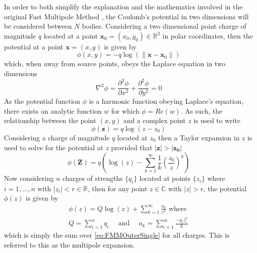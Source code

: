 In order to both simplify the explanation and the mathematics involved in the original Fast Multipole Method \cite{Greengard1987ASimulations}, the Coulomb's potential in two dimensions will be considered between $N$ bodies. Considering a two dimensional point charge of magnitude $q$ located at a point $\bm{x}_0 = (x_0,y_0) \in \mathbb{R}^2$ in polar coordinates, then the potential at a point $\bm{x} = (x,y)$ is given by
\begin{equation*}
    \phi(x,y) = -q\log(\lVert \bm{x} - \bm{x}_0 \rVert)
\end{equation*}
which, when away from source points, obeys the Laplace equation in two dimensions
\begin{equation*}
    \nabla^2 \phi = \frac{\partial^2 \phi}{\partial x^2} + \frac{\partial^2 \phi}{\partial y^2} = 0
\end{equation*}
As the potential function $\phi$ is a harmonic function obeying Laplace's equation, there exists an analytic function $w$ for which $\phi = Re(w)$. As such, the relationship between the point $(x,y)$ and a complex point $z$ is used to write
\begin{equation*}
    \phi(\bm{z}) = q\log(z-z_0)
\end{equation*}
Considering a charge of magnitude $q$ located at $z_0$ then a Taylor expansion in $z$ is used to  solve for the potential at $z$ provided that $|\bm{z}|>|\bm{z_0}|$
\begin{equation}
\label{eq:FMMOuterSingle}
    \phi(\bm{Z}) = q\left( \log(z) - \sum_{k=1}^{\infty} \frac{1}{k}\left( \frac{z_0}{z} \right)^k \right)
\end{equation}
Now considering $n$ charges of strengths $\{q_i\}$ located at points $\{z_i\}$ where $i=1,\dots,n$ with $|z_i|<r\in\mathbb{R}$, then for any point $z\in\mathbb{C}$ with $|z|>r$, the potential $\phi(z)$ is given by
\begin{equation}
\label{eq:FMMOuterMulti}
\begin{gathered}
    \phi(z) = Q\log(z) + \sum_{k=1}^\infty \frac{a_k}{z^k} \text{ where }\\
    Q = \sum_{i=1}^n q_i \quad \text{ and } \quad a_k = \sum_{i=1}^{m} \frac{-q_i z_i^k}{k}
\end{gathered}
\end{equation}
which is simply the sum over \cref{eq:FMMOuterSingle} for all charges. This is referred to this as the multipole expansion. 

